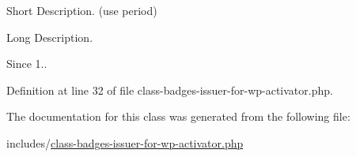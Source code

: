 Short Description. (use period)

Long Description.

\begin{DoxySince}{Since}
1.. 
\end{DoxySince}


Definition at line 32 of file class-\/badges-\/issuer-\/for-\/wp-\/activator.\+php.



The documentation for this class was generated from the following file\+:\begin{DoxyCompactItemize}
\item 
includes/\hyperlink{class-badges-issuer-for-wp-activator_8php}{class-\/badges-\/issuer-\/for-\/wp-\/activator.\+php}\end{DoxyCompactItemize}
